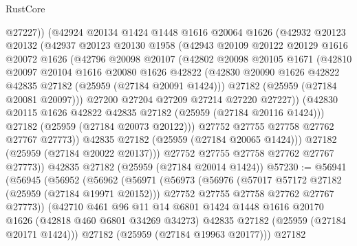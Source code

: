 \begin{lexlean}{RustCore}
\begin{coremodule}
              @27227))
          (@42924
            @20134
            @1424
            @1448
            @1616
            @20064
            @1626
            (@42932
              @20123
              @20132
              (@42937
                @20123
                @20130
                @1958
                (@42943
                  @20109
                  @20122
                  @20129
                  @1616
                  @20072
                  @1626
                  (@42796
                    @20098
                    @20107
                    (@42802
                      @20098
                      @20105
                      @1671
                      (@42810
                        @20097
                        @20104
                        @1616
                        @20080
                        @1626
                        @42822
                        (@42830 @20090 @1626 @42822 @42835 @27182 (@25959 (@27184 @20091 @1424)))
                        @27182
                        (@25959 (@27184 @20081 @20097)))
                      @27200
                      @27204
                      @27209
                      @27214
                      @27220
                      @27227))
                  (@42830 @20115 @1626 @42822 @42835 @27182 (@25959 (@27184 @20116 @1424)))
                  @27182
                  (@25959 (@27184 @20073 @20122)))
                @27752
                @27755
                @27758
                @27762
                @27767
                @27773))
            @42835
            @27182
            (@25959 (@27184 @20065 @1424)))
          @27182
          (@25959 (@27184 @20022 @20137)))
        @27752
        @27755
        @27758
        @27762
        @27767
        @27773))
    @42835
    @27182
    (@25959 (@27184 @20014 @1424))
@57230 := @56941
    (@56945
      (@56952
        (@56962
          (@56971
            (@56973
              (@56976
                (@57017 @57172 @27182 (@25959 (@27184 @19971 @20152)))
                @27752
                @27755
                @27758
                @27762
                @27767
                @27773))
            (@42710
              @461
              @96
              @11
              @14
              @6801
              @1424
              @1448
              @1616
              @20170
              @1626
              (@42818 @460 @6801 @34269 @34273)
              @42835
              @27182
              (@25959 (@27184 @20171 @1424)))
            @27182
            (@25959 (@27184 @19963 @20177)))
          @27182

\end{coremodule}
\end{lexlean}
